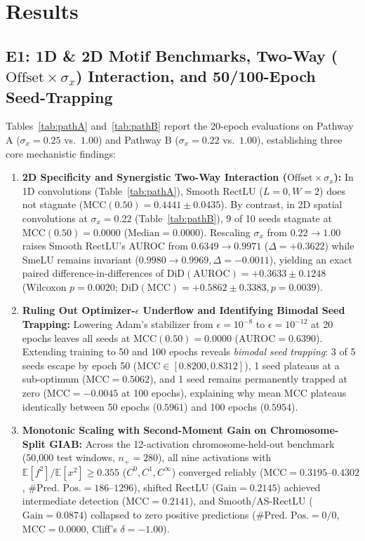 \documentclass[10pt,a4paper]{article}
\begin{document}
\section{Results}

\subsection{E1: 1D \& 2D Motif Benchmarks, Two-Way ($\text{Offset} \times \sigma_x$) Interaction, and 50/100-Epoch Seed-Trapping}
Tables~\ref{tab:pathA} and~\ref{tab:pathB} report the 20-epoch evaluations on Pathway A ($\sigma_x = 0.25$ vs.\ $1.00$) and Pathway B ($\sigma_x = 0.22$ vs.\ $1.00$), establishing three core mechanistic findings:
\begin{enumerate}
    \item \textbf{2D Specificity and Synergistic Two-Way Interaction ($\text{Offset} \times \sigma_x$):} In 1D convolutions (Table~\ref{tab:pathA}), Smooth RectLU ($L=0, W=2$) does not stagnate ($\text{MCC}(0.50) = 0.4441 \pm 0.0435$). By contrast, in 2D spatial convolutions at $\sigma_x = 0.22$ (Table~\ref{tab:pathB}), 9 of 10 seeds stagnate at $\text{MCC}(0.50) = 0.0000$ ($\text{Median} = 0.0000$). Rescaling $\sigma_x$ from $0.22 \to 1.00$ raises Smooth RectLU's AUROC from $0.6349 \to 0.9971$ ($\Delta = +0.3622$) while SmeLU remains invariant ($0.9980 \to 0.9969, \Delta = -0.0011$), yielding an exact paired difference-in-differences of $\text{DiD}(\text{AUROC}) = +0.3633 \pm 0.1248$ (Wilcoxon $p = 0.0020$; $\text{DiD}(\text{MCC}) = +0.5862 \pm 0.3383, p = 0.0039$).
    \item \textbf{Ruling Out Optimizer-$\epsilon$ Underflow and Identifying Bimodal Seed Trapping:} Lowering Adam's stabilizer from $\epsilon = 10^{-8}$ to $\epsilon = 10^{-12}$ at 20 epochs leaves all seeds at $\text{MCC}(0.50) = 0.0000$ ($\text{AUROC} = 0.6390$). Extending training to 50 and 100 epochs reveals \textit{bimodal seed trapping}: 3 of 5 seeds escape by epoch 50 ($\text{MCC} \in [0.8200, 0.8312]$), 1 seed plateaus at a sub-optimum ($\text{MCC} = 0.5062$), and 1 seed remains permanently trapped at zero ($\text{MCC} = -0.0045$ at 100 epochs), explaining why mean MCC plateaus identically between 50 epochs ($0.5961$) and 100 epochs ($0.5954$).
    \item \textbf{Monotonic Scaling with Second-Moment Gain on Chromosome-Split GIAB:} Across the 12-activation chromosome-held-out benchmark (50,000 test windows, $n_+=280$), all nine activations with $\mathbb{E}[f^2]/\mathbb{E}[x^2] \ge 0.355$ ($C^0, C^1, C^\infty$) converged reliably ($\text{MCC} = 0.3195$--$0.4302$, $\#\text{Pred.\ Pos.} = 186$--$1296$), shifted RectLU ($\text{Gain} = 0.2145$) achieved intermediate detection ($\text{MCC} = 0.2141$), and Smooth/AS-RectLU ($\text{Gain} = 0.0874$) collapsed to zero positive predictions ($\#\text{Pred.\ Pos.} = 0/0$, $\text{MCC} = 0.0000$, Cliff's $\delta = -1.00$).
\end{enumerate}
\end{document}
